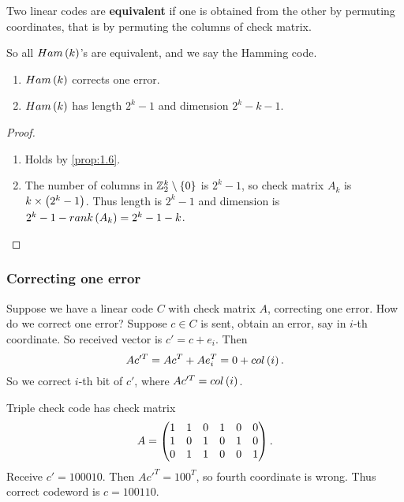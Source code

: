 \setcounter{MaxMatrixCols}{10}

\begin{definition*}
Two linear codes are \textbf{equivalent} if one is obtained from the other by permuting coordinates, that is by permuting the columns of check matrix.
\end{definition*}

So all $ Ham\br{k} $'s are equivalent, and we say the Hamming code.

\begin{proposition}
\label{prop:1.7}
\hfill
\begin{enumerate}
\item $ Ham\br{k} $ corrects one error.
\item $ Ham\br{k} $ has length $ 2^k - 1 $ and dimension $ 2^k - k - 1 $.
\end{enumerate}
\end{proposition}

\begin{proof}
\hfill
\begin{enumerate}
\item Holds by \ref{prop:1.6}.
\item The number of columns in $ \Z_2^k \setminus \cbr{0} $ is $ 2^k - 1 $, so check matrix $ A_k $ is $ k \times \br{2^k - 1} $. Thus length is $ 2^k - 1 $ and dimension is $ 2^k - 1 - rank\br{A_k} = 2^k - 1 - k $.
\end{enumerate}
\end{proof}

\subsubsection{Correcting one error}

Suppose we have a linear code $ C $ with check matrix $ A $, correcting one error. How do we correct one error? Suppose $ c \in C $ is sent, obtain an error, say in $ i $-th coordinate. So received vector is $ c' = c + e_i $. Then
$$ Ac'^T = Ac^T + Ae_i^T = 0 + col\br{i}. $$
So we correct $ i $-th bit of $ c' $, where $ Ac'^T = col\br{i} $.

\begin{example*}
Triple check code has check matrix
$$ A = \begin{pmatrix} 1 & 1 & 0 & 1 & 0 & 0 \\ 1 & 0 & 1 & 0 & 1 & 0 \\ 0 & 1 & 1 & 0 & 0 & 1 \end{pmatrix}. $$
Receive $ c' = 100010 $. Then $ Ac'^T = 100^T $, so fourth coordinate is wrong. Thus correct codeword is $ c = 100110 $.
\end{example*}

\pagebreak

